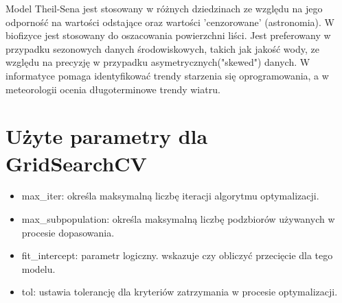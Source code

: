 \hspace{1.5cm} Model Theil-Sena jest stosowany w różnych dziedzinach ze względu na jego odporność na wartości odstające oraz wartości 'cenzorowane' (astronomia). W biofizyce jest stosowany do oszacowania powierzchni liści. Jest preferowany w przypadku sezonowych danych środowiskowych, takich jak jakość wody, ze względu na precyzję w przypadku asymetrycznych("skewed") danych. W informatyce pomaga identyfikować trendy starzenia się oprogramowania, a w meteorologii ocenia długoterminowe trendy wiatru.



{}
\section*{Użyte parametry dla GridSearchCV \cite{url_TheilSenRegressor, url_grid_search}}
\vspace{-1.0em}

\begin{itemize}
\setlength\itemsep{-0.5em}
\item max\_iter: określa maksymalną liczbę iteracji algorytmu optymalizacji.
\item max\_subpopulation: określa maksymalną liczbę podzbiorów używanych w procesie dopasowania.
\item fit\_intercept: parametr logiczny. wskazuje czy obliczyć przecięcie dla tego modelu.
\item tol: ustawia tolerancję dla kryteriów zatrzymania w procesie optymalizacji.
\end{itemize}

\noindent\makebox[\linewidth]{\rule{\paperwidth}{0.4pt}}
